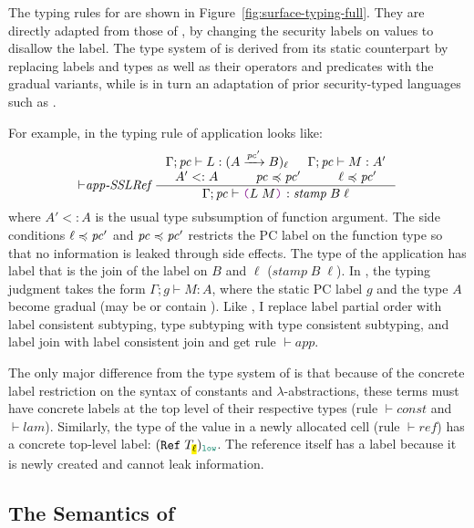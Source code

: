 The typing rules for \Surface are shown in Figure~\ref{fig:surface-typing-full}.
They are directly adapted from those of \GSLRef, by changing the security labels
on values to disallow the \unk label. The type system of \GSLRef is derived from
its static counterpart \SSLRef by replacing labels and types as well as their
operators and predicates with the gradual variants, while \SSLRef is in turn an
adaptation of prior security-typed languages such as \textcite{Fennell:2013ab,
  heintze1998slam, zdancewic2002programming}.

For example, in \SSLRef the typing rule of application looks like:
\begin{equation*}
{\vdash}\textit{app-SSLRef}~
\inference{\Gamma; \pc \vdash L : (\Fun{A}{\pc'}{B})_\ell & \Gamma; \pc \vdash M : A' \\
  A' <: A & \pc \preccurlyeq \pc' & \ell \preccurlyeq \pc'}
{\Gamma; \pc \vdash \app{L}{M}{} : \mathit{stamp}\;B\;\ell}
\end{equation*}
where $A' <: A$ is the usual type subsumption of function argument. The side
conditions $\ell \preccurlyeq \mathit{pc}'$ and $\mathit{pc} \preccurlyeq \mathit{pc}'$ restricts the PC
label on the function type so that no information is leaked through side
effects. The type of the application has label that is the join of the label on
$B$ and $\ell$ ($\mathit{stamp}\;B\;\ell$). In \Surface, the typing judgment
takes the form $\Gamma ; g \vdash M : A$, where the static PC label $g$ and the
type $A$ become gradual (may be or contain \unk). Like \GSLRef, I replace label
partial order with label consistent subtyping, type subtyping with type
consistent subtyping, and label join with label consistent join and get rule
${\vdash}\mathit{app}$.

The only major difference from the type system of \GSLRef is that because of the
concrete label restriction on the syntax of constants and
$\lambda$-abstractions, these terms must have concrete labels at the top level
of their respective types (rule ${\vdash}\mathit{const}$ and
${\vdash}\mathit{lam}$). Similarly, the type of the value in a newly allocated
cell (rule ${\vdash}\mathit{ref}$) has a concrete top-level label:
$(\Refer{T_{\text{\hl{$\ell$}}}})_{\low}$. The reference itself has a \low label
because it is newly created and cannot leak information.

\subsection{The Semantics of \Surface}
\label{sec:surface-semantics}

